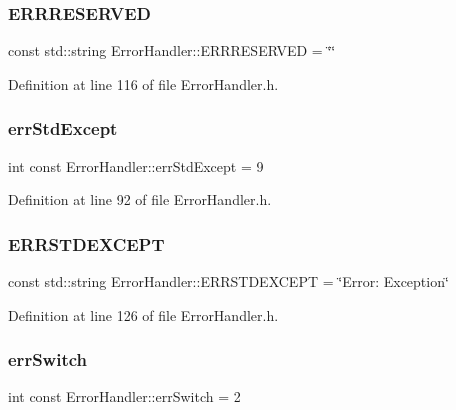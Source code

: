 \subsubsection{\texorpdfstring{ERRRESERVED}{ERRRESERVED}}
{\footnotesize\ttfamily const std\+::string Error\+Handler\+::\+E\+R\+R\+R\+E\+S\+E\+R\+V\+ED = \char`\"{}\char`\"{}\hspace{0.3cm}{\ttfamily [static]}}



Definition at line 116 of file Error\+Handler.\+h.

\mbox{\label{classErrorHandler_a6615c791920f871f02b017d415acf991}} 
\subsubsection{\texorpdfstring{errStdExcept}{errStdExcept}}
{\footnotesize\ttfamily int const Error\+Handler\+::err\+Std\+Except = 9\hspace{0.3cm}{\ttfamily [static]}}



Definition at line 92 of file Error\+Handler.\+h.

\mbox{\label{classErrorHandler_ae554a9167e1821ba8b49fc3e0bad3288}} 
\subsubsection{\texorpdfstring{ERRSTDEXCEPT}{ERRSTDEXCEPT}}
{\footnotesize\ttfamily const std\+::string Error\+Handler\+::\+E\+R\+R\+S\+T\+D\+E\+X\+C\+E\+PT = \char`\"{}Error\+: Exception\char`\"{}\hspace{0.3cm}{\ttfamily [static]}}



Definition at line 126 of file Error\+Handler.\+h.

\mbox{\label{classErrorHandler_a348455e58aa6cbd002d7652da8b8c1bd}} 
\subsubsection{\texorpdfstring{errSwitch}{errSwitch}}
{\footnotesize\ttfamily int const Error\+Handler\+::err\+Switch = 2\hspace{0.3cm}{\ttfamily [static]}}



